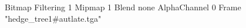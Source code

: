 {Bitmap
	{Filtering 1}
	{Mipmap 1}
	{Blend none}
	{AlphaChannel 0}
	{Frame "hedge_tree1#autlate.tga"}
}
